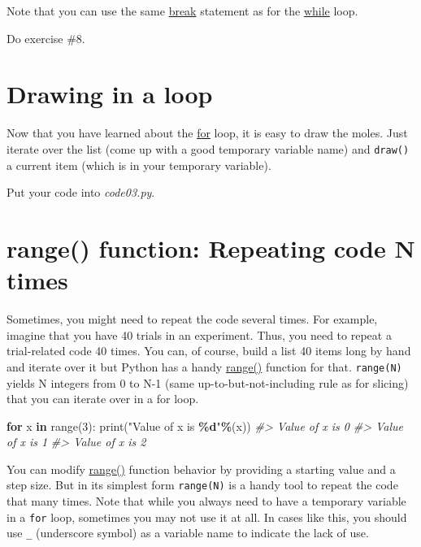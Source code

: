 \documentclass[
]{book}
\newenvironment{Shaded}{\begin{snugshade}}{\end{snugshade}}
\newcommand{\BuiltInTok}[1]{#1}
\newcommand{\CommentTok}[1]{\textcolor[rgb]{0.56,0.35,0.01}{\textit{#1}}}
\newcommand{\ControlFlowTok}[1]{\textcolor[rgb]{0.13,0.29,0.53}{\textbf{#1}}}
\newcommand{\DecValTok}[1]{\textcolor[rgb]{0.00,0.00,0.81}{#1}}
\newcommand{\KeywordTok}[1]{\textcolor[rgb]{0.13,0.29,0.53}{\textbf{#1}}}
\newcommand{\NormalTok}[1]{#1}
\newcommand{\OperatorTok}[1]{\textcolor[rgb]{0.81,0.36,0.00}{\textbf{#1}}}
\newcommand{\SpecialCharTok}[1]{\textcolor[rgb]{0.81,0.36,0.00}{\textbf{#1}}}
\newcommand{\StringTok}[1]{\textcolor[rgb]{0.31,0.60,0.02}{#1}}
\begin{document}
Note that you can use the same \href{https://docs.python.org/3/tutorial/controlflow.html?highlight=loop\#break-and-continue-statements-and-else-clauses-on-loops}{break} statement as for the \href{https://docs.python.org/3/reference/compound_stmts.html\#the-while-statement}{while} loop.

Do exercise \#8.

\hypertarget{drawing-in-a-loop}{%
\section{Drawing in a loop}\label{drawing-in-a-loop}}

Now that you have learned about the \protect\hyperlink{for-loop}{for} loop, it is easy to draw the moles. Just iterate over the list (come up with a good temporary variable name) and \texttt{draw()} a current item (which is in your temporary variable).

Put your code into \emph{code03.py}.

\hypertarget{range}{%
\section{range() function: Repeating code N times}\label{range}}

Sometimes, you might need to repeat the code several times. For example, imagine that you have 40 trials in an experiment. Thus, you need to repeat a trial-related code 40 times. You can, of course, build a list 40 items long by hand and iterate over it but Python has a handy \href{https://docs.python.org/3/tutorial/controlflow.html?highlight=loop\#the-range-function}{range()} function for that. \texttt{range(N)} yields N integers from 0 to N-1 (same up-to-but-not-including rule as for slicing) that you can iterate over in a for loop.

\begin{Shaded}
\begin{Highlighting}[]
\ControlFlowTok{for}\NormalTok{ x }\KeywordTok{in} \BuiltInTok{range}\NormalTok{(}\DecValTok{3}\NormalTok{):}
    \BuiltInTok{print}\NormalTok{(}\StringTok{"Value of x is }\SpecialCharTok{\%d}\StringTok{"}\OperatorTok{\%}\NormalTok{(x))}
\CommentTok{\#\textgreater{} Value of x is 0}
\CommentTok{\#\textgreater{} Value of x is 1}
\CommentTok{\#\textgreater{} Value of x is 2}
\end{Highlighting}
\end{Shaded}

You can modify \href{https://docs.python.org/3/library/stdtypes.html\#range}{range()} function behavior by providing a starting value and a step size. But in its simplest form \texttt{range(N)} is a handy tool to repeat the code that many times. Note that while you always need to have a temporary variable in a \texttt{for} loop, sometimes you may not use it at all. In cases like this, you should use \texttt{\_} (underscore symbol) as a variable name to indicate the lack of use.
\end{document}
